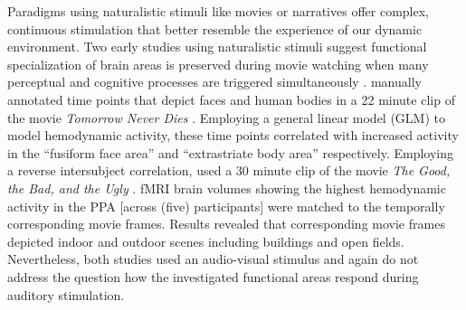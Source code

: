 \documentclass[english]{article}
\begin{document}
Paradigms using naturalistic stimuli like movies
\citep{hasson2008neurocinematics, sonkusare2019naturalistic} or narratives
\citep{honey2012not, lerner2011topographic, silbert2014coupled} offer complex,
continuous stimulation that better resemble the experience of our dynamic
environment.
Two early studies using naturalistic stimuli suggest functional specialization
of brain areas is preserved during movie watching when many perceptual and
cognitive processes are triggered simultaneously \citep{bartels2004mapping,
hasson2004intersubject}.
\cite{bartels2004mapping} manually annotated time points that depict faces and
human bodies in a 22 minute clip of the movie \textit{Tomorrow Never Dies}
\citep{tomorrowneverdies}.
Employing a general linear model (GLM) to model hemodynamic activity, these time
points correlated with increased activity in the ``fusiform face area''
\citep{kanwisher1997ffa} and ``extrastriate body area''
\citep{downing2001bodyarea} respectively.
Employing a reverse intersubject correlation, \cite{hasson2004intersubject} used
a 30 minute clip of the movie \textit{The Good, the Bad, and the Ugly}
\citep{goodbadugly}.
fMRI brain volumes showing the highest hemodynamic activity in the PPA [across
(five) participants] were matched to the temporally corresponding movie frames.
Results revealed that corresponding movie frames depicted indoor and outdoor
scenes including buildings and open fields.
Nevertheless, both studies used an audio-visual stimulus and again do not
address the question how the investigated functional areas respond during
auditory stimulation.

\end{document}
